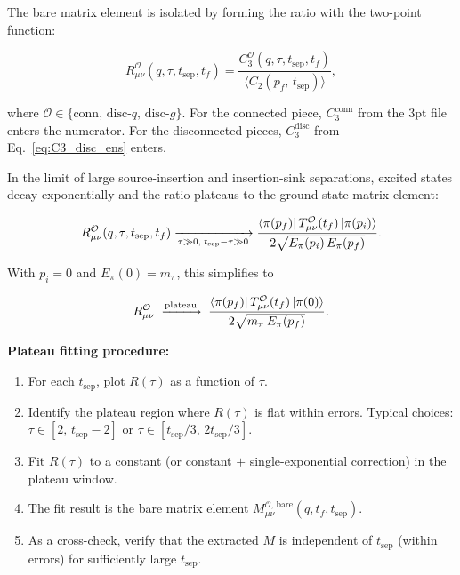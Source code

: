 \documentclass[11pt,a4paper]{article}
\begin{document}
The bare matrix element is isolated by forming the ratio with the two-point function:

\begin{equation}\label{eq:ratio}
  R_{\mu\nu}^{\mathcal{O}}(q, \tau, t_{\text{sep}}, t_f)
    = \frac{C_3^{\mathcal{O}}(q, \tau, t_{\text{sep}}, t_f)}
           {\langle C_2(p_f,\, t_{\text{sep}}) \rangle},
\end{equation}

where $\mathcal{O} \in \{\text{conn},\, \text{disc-}q,\, \text{disc-}g\}$.
For the connected piece, $C_3^{\text{conn}}$ from the 3pt file enters the numerator.
For the disconnected pieces, $C_3^{\text{disc}}$ from Eq.~\eqref{eq:C3_disc_ens} enters.

In the limit of large source-insertion and insertion-sink separations, excited states
decay exponentially and the ratio plateaus to the ground-state matrix element:

\begin{equation}\label{eq:plateau}
  R_{\mu\nu}^{\mathcal{O}}(q, \tau, t_{\text{sep}}, t_f)
    \xrightarrow[\tau \gg 0,\; t_{\text{sep}}-\tau \gg 0]{}
    \frac{\bra{\pi(p_f)} T_{\mu\nu}^{\mathcal{O}}(t_f) \ket{\pi(p_i)}}
         {2\sqrt{E_\pi(p_i)\,E_\pi(p_f)}}.
\end{equation}

With $p_i = 0$ and $E_\pi(0) = m_\pi$, this simplifies to

\begin{equation}\label{eq:plateau_rest}
  R_{\mu\nu}^{\mathcal{O}} \;\xrightarrow{\text{plateau}}\;
    \frac{\bra{\pi(p_f)} T_{\mu\nu}^{\mathcal{O}}(t_f) \ket{\pi(0)}}
         {2\sqrt{m_\pi\,E_\pi(p_f)}}.
\end{equation}

\textbf{Plateau fitting procedure:}
\begin{enumerate}[nosep]
  \item For each $t_{\text{sep}}$, plot $R(\tau)$ as a function of $\tau$.
  \item Identify the plateau region where $R(\tau)$ is flat within errors.
    Typical choices: $\tau \in [2,\, t_{\text{sep}}-2]$ or $\tau \in [t_{\text{sep}}/3,\, 2t_{\text{sep}}/3]$.
  \item Fit $R(\tau)$ to a constant (or constant $+$ single-exponential correction)
    in the plateau window.
  \item The fit result is the bare matrix element
    $M_{\mu\nu}^{\mathcal{O},\,\text{bare}}(q, t_f, t_{\text{sep}})$.
  \item As a cross-check, verify that the extracted $M$ is independent of $t_{\text{sep}}$
    (within errors) for sufficiently large $t_{\text{sep}}$.
\end{enumerate}
\end{document}
